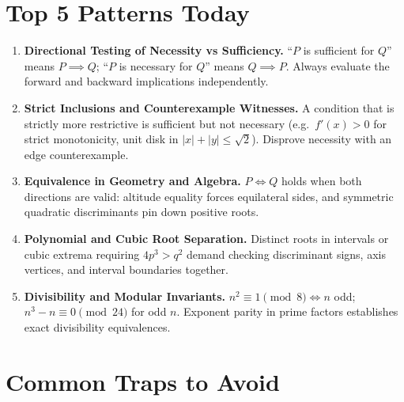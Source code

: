\documentclass[11pt,a4paper]{article}
\begin{document}
\section*{Top 5 Patterns Today}

\begin{enumerate}[leftmargin=2em, itemsep=4pt]
  \item \textbf{Directional Testing of Necessity vs Sufficiency.}
        ``$P$ is sufficient for $Q$'' means $P \implies Q$; ``$P$ is necessary for $Q$'' means $Q \implies P$. Always evaluate the forward and backward implications independently. 
  \item \textbf{Strict Inclusions and Counterexample Witnesses.}
        A condition that is strictly more restrictive is sufficient but not necessary (e.g.\ $f'(x)>0$ for strict monotonicity, unit disk in $|x|+|y|\le\sqrt{2}$). Disprove necessity with an edge counterexample. 
  \item \textbf{Equivalence in Geometry and Algebra.}
        $P \iff Q$ holds when both directions are valid: altitude equality forces equilateral sides, and symmetric quadratic discriminants pin down positive roots. 
  \item \textbf{Polynomial and Cubic Root Separation.}
        Distinct roots in intervals or cubic extrema requiring $4p^3 > q^2$ demand checking discriminant signs, axis vertices, and interval boundaries together. 
  \item \textbf{Divisibility and Modular Invariants.}
        $n^2 \equiv 1 \pmod 8 \iff n$ odd; $n^3-n \equiv 0 \pmod{24}$ for odd $n$. Exponent parity in prime factors establishes exact divisibility equivalences. 
\end{enumerate}

\section*{Common Traps to Avoid}
\end{document}
